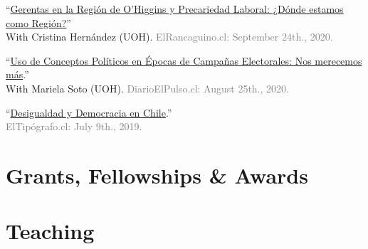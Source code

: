 \documentclass[letterpaper]{article}
\renewenvironment{itemize}{
  \begin{list}{}{
    \setlength{\leftmargin}{1.5em}
  }
}{
  \end{list}
}
\begin{document}
\begin{itemize}
    \item[\textcolor{gray}{\textbullet}] ``\href{https://www.elrancaguino.cl/2020/09/24/gerentas-en-la-region-de-ohiggins-y-precariedad-laboral-donde-estamos-como-region/}{Gerentas en la Regi\'on de O'Higgins y Precariedad Laboral: ¿D\'onde estamos como Regi\'on?}''\\With Cristina Hern\'andez (UOH). \textcolor{gray}{ElRancaguino.cl: September 24th., 2020.}
   
    \item[\textcolor{gray}{\textbullet}] ``\href{https://www.diarioelpulso.cl/2020/08/25/uso-de-conceptos-politicos-en-epocas-de-campanas-electorales-nos-merecemos-mas/}{Uso de Conceptos Pol\'iticos en \'Epocas de Campa\~nas Electorales: Nos merecemos m\'as}.''\\With Mariela Soto (UOH). \textcolor{gray}{DiarioElPulso.cl: August 25th., 2020.}
   
    \item[\textcolor{gray}{\textbullet}] ``\href{https://eltipografo.cl/2019/07/desigualdad-y-democracia-en-chile}{Desigualdad y Democracia en Chile}.''\\\textcolor{gray}{ElTip\'ografo.cl: July 9th., 2019.}


  \end{itemize}

\section*{Grants, Fellowships \& Awards}
{\unskip}



\section*{Teaching}

{\unskip}

\end{document}
